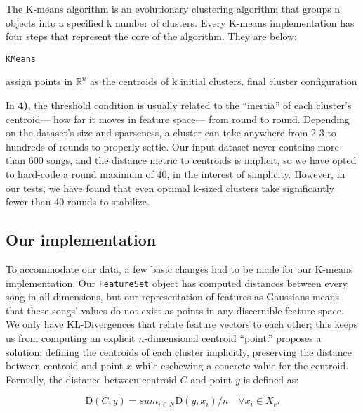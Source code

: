 \documentclass[12pt,twocolumn,titlepage]{article}
\begin{document}
The K-means algorithm is an evolutionary clustering algorithm that groups n  objects into a specified k number of clusters. Every K-means implementation has four steps that represent the core of the algorithm. They are below:

\begin{algorithm}
 \caption{\texttt{KMeans}}\label{algoCPOR}
 assign points in $\mathbb{R}^n$ as the centroids of k initial clusters.\;
 \KwRet final cluster configuration\;
\end{algorithm}

In \textbf{4)}, the threshold condition is usually related to the ``inertia'' of each cluster's centroid— how far it moves in feature space— from round to round. Depending on the dataset's size and sparseness, a cluster can take anywhere from 2-3 to hundreds of rounds to properly settle. Our input dataset never contains more than 600 songs, and the distance metric to centroids is implicit, so we have opted to hard-code a round maximum of 40, in the interest of simplicity. However, in our tests, we have found that even optimal k-sized clusters take significantly fewer than 40 rounds to stabilize. 

\subsection{Our implementation}

To accommodate our data, a few basic changes had to be made for our K-means implementation. Our \texttt{FeatureSet} object has computed distances between every song in all dimensions, but our representation of features as Gaussians means that these songs' values do not exist as points in any discernible feature space. We only have KL-Divergences that relate feature vectors to each other; this keeps us from computing an explicit $n$-dimensional centroid ``point.'' \cite{MaggbladeHongKao} proposes a solution: defining the centroids of each cluster implicitly, preserving the distance between centroid and point $x$  while eschewing a concrete value for the centroid. Formally, the distance between centroid $C$ and point $y$ is defined as:

\begin{equation}\label{}
\mathrm{D}(C, y) = sum_{i \in N}{}{\mathrm{D}(y, x_i) / n} \quad \forall x_i \in X_c.
\end{equation}
\end{document}
